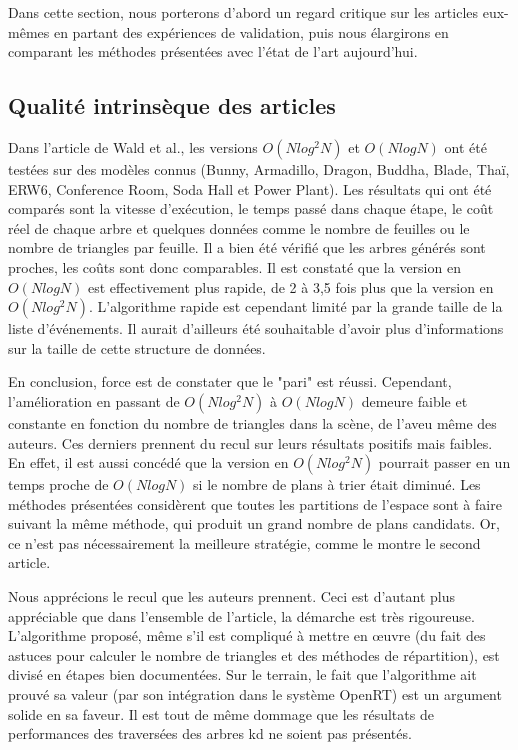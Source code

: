 \documentclass[a4paper]{article}
\begin{document}
Dans cette section, nous porterons d'abord un regard critique sur les articles eux-mêmes en partant des expériences de validation, puis nous élargirons en comparant les méthodes présentées avec l'état de l'art aujourd'hui.

\subsection{Qualité intrinsèque des articles}

Dans l'article de Wald et al., les versions $O(Nlog^2N)$ et $O(NlogN)$ ont été testées sur des modèles connus (Bunny, Armadillo, Dragon, Buddha, Blade, Thaï, ERW6, Conference Room, Soda Hall et Power Plant). Les résultats qui ont été comparés sont la vitesse d'exécution, le temps passé dans chaque étape, le coût réel de chaque arbre et quelques données comme le nombre de feuilles ou le nombre de triangles par feuille. Il a bien été vérifié que les arbres générés sont proches, les coûts sont donc comparables. Il est constaté que la version en $O(NlogN)$ est effectivement plus rapide, de 2 à 3,5 fois plus que la version en $O(Nlog^2N)$. L'algorithme rapide est cependant limité par la grande taille de la liste d'événements. Il aurait d'ailleurs été souhaitable d'avoir plus d'informations sur la taille de cette structure de données.

En conclusion, force est de constater que le "pari" est réussi. Cependant, l'amélioration en passant de $O(Nlog^2N)$ à $O(NlogN)$ demeure faible et constante en fonction du nombre de triangles dans la scène, de l'aveu même des auteurs. Ces derniers prennent du recul sur leurs résultats positifs mais faibles. En effet, il est aussi concédé que la version en $O(Nlog^2N)$ pourrait passer en un temps proche de $O(NlogN)$ si le nombre de plans à trier était diminué. Les méthodes présentées considèrent que toutes les partitions de l'espace sont à faire suivant la même méthode, qui produit un grand nombre de plans candidats. Or, ce n'est pas nécessairement la meilleure stratégie, comme le montre le second article.

Nous apprécions le recul que les auteurs prennent. Ceci est d'autant plus appréciable que dans l'ensemble de l'article, la démarche est très rigoureuse. L'algorithme proposé, même s'il est compliqué à mettre en œuvre (du fait des astuces pour calculer le nombre de triangles et des méthodes de répartition), est divisé en étapes bien documentées. Sur le terrain, le fait que l'algorithme ait prouvé sa valeur (par son intégration dans le système OpenRT) est un argument solide en sa faveur. Il est tout de même dommage que les résultats de performances des traversées des arbres kd ne soient pas présentés.
\end{document}
